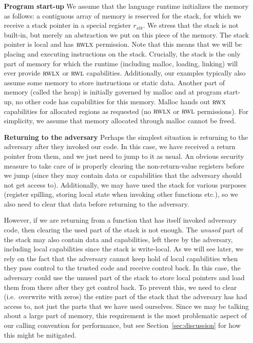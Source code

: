 \documentclass[format=acmsmall, review=false, screen=true]{acmart}
\renewcommand{\sectionname}{Section}
\newcommand{\var}[1]{\mathit{#1}}
\newcommand{\stk}{\var{stk}}
\newcommand{\plainperm}[1]{\textsc{#1}}
\newcommand{\rwx}{\plainperm{rwx}}
\newcommand{\readwritel}{\plainperm{rwl}}
\newcommand{\rwl}{\readwritel}
\newcommand{\rwlx}{\plainperm{rwlx}}
\begin{document}
\textbf{Program start-up} We assume that the language runtime initializes the
memory as follows: a contiguous array of memory is reserved for the stack, for
which we receive a stack pointer in a special register $r_\stk$. We stress that
the stack is not built-in, but merely an abstraction we put on this piece of the
memory. The stack pointer is local and has $\rwlx$ permission. Note that this
means that we will be placing and executing instructions on the stack.
Crucially, the stack is the only part of memory for which the runtime (including
malloc, loading, linking) will ever provide $\rwlx$ or $\rwl$ capabilities.
Additionally, our examples typically also assume some memory to store
instructions or static data. Another part of memory (called the heap) is
initially governed by malloc and at program start-up, no other code has
capabilities for this memory. Malloc hands out $\rwx$ capabilities for allocated
regions as requested (no $\rwlx$ or $\rwl$ permissions). For simplicity, we
assume that memory allocated through malloc cannot be freed.

\textbf{Returning to the adversary} Perhaps the simplest situation is returning
to the adversary after they invoked our code. In this case, we have received a
return pointer from them, and we just need to jump to it as usual. An obvious
security measure to take care of is properly clearing the non-return-value
registers before we jump (since they may contain data or capabilities that the
adversary should not get access to). Additionally, we may have used the stack
for various purposes (register spilling, storing local state when invoking other
functions etc.), so we also need to clear that data before returning to the
adversary.

However, if we are returning from a function that has itself invoked adversary
code, then clearing the used part of the stack is not enough. The \emph{unused}
part of the stack may also contain data and capabilities, left there by the
adversary, including local capabilities since the stack is write-local. As we
will see later, we rely on the fact that the adversary cannot keep hold of local
capabilities when they pass control to the trusted code and receive control
back. In this case, the adversary could use the unused part of the stack to
store local pointers and load them from there after they get control back. To
prevent this, we need to clear (i.e.\ overwrite with zeros) the entire part of
the stack that the adversary has had access to, not just the parts that we have
used ourselves. Since we may be talking about a large part of memory, this
requirement is the most problematic aspect of our calling convention for
performance, but see \sectionname~\ref{sec:discussion} for how this might be
mitigated.
\end{document}
